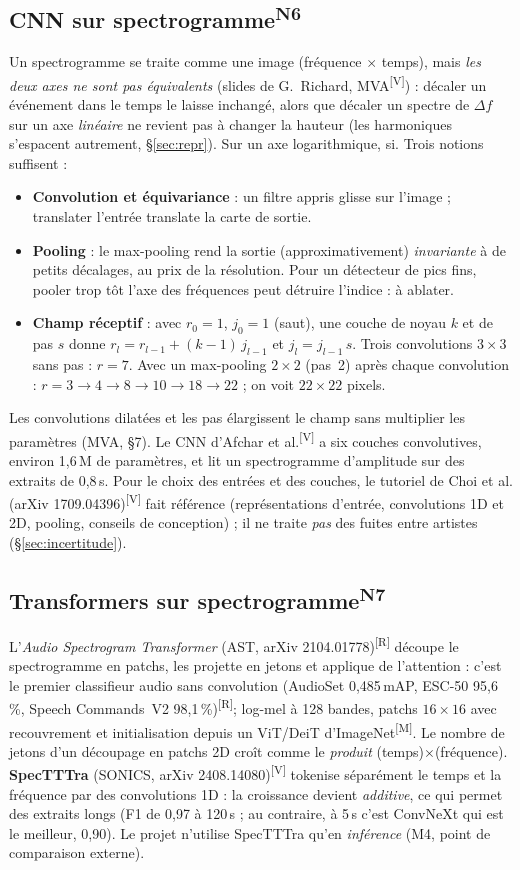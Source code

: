 \documentclass[10pt,a4paper]{article}
\newcommand{\sV}{\textsuperscript{\scriptsize\textcolor{green!40!black}{[V]}}}
\newcommand{\sR}{\textsuperscript{\scriptsize\textcolor{orange!80!black}{[R]}}}
\newcommand{\sM}{\textsuperscript{\scriptsize\textcolor{red!70!black}{[M]}}}
\newcommand{\nref}[1]{\textsuperscript{\scriptsize\textcolor{black!55}{#1}}}
\begin{document}
\subsection{CNN sur spectrogramme\nref{N6}}
Un spectrogramme se traite comme une image (fréquence $\times$ temps), mais \emph{les deux axes ne sont pas équivalents} (slides de G.~Richard, MVA\sV) : décaler un événement dans le temps le laisse inchangé, alors que décaler un spectre de $\Delta f$ sur un axe \emph{linéaire} ne revient pas à changer la hauteur (les harmoniques s'espacent autrement, §\ref{sec:repr}). Sur un axe logarithmique, si. Trois notions suffisent :
\begin{itemize}
  \item \textbf{Convolution et équivariance} : un filtre appris glisse sur l'image ; translater l'entrée translate la carte de sortie.
  \item \textbf{Pooling} : le max-pooling rend la sortie (approximativement) \emph{invariante} à de petits décalages, au prix de la résolution. Pour un détecteur de pics fins, pooler trop tôt l'axe des fréquences peut détruire l'indice : à ablater.
  \item \textbf{Champ réceptif} : avec $r_0=1$, $j_0=1$ (saut), une couche de noyau $k$ et de pas $s$ donne $r_l=r_{l-1}+(k-1)\,j_{l-1}$ et $j_l=j_{l-1}\,s$. Trois convolutions $3\times3$ sans pas : $r=7$. Avec un max-pooling $2\times2$ (pas~2) après chaque convolution : $r=3\to4\to8\to10\to18\to22$ ; on voit $22\times22$ pixels.
\end{itemize}
Les convolutions dilatées et les pas élargissent le champ sans multiplier les paramètres (MVA, \S7). Le CNN d'Afchar et al.\sV{} a six couches convolutives, environ 1,6\,M de paramètres, et lit un spectrogramme d'amplitude sur des extraits de 0,8\,s. Pour le choix des entrées et des couches, le tutoriel de Choi et al. (arXiv 1709.04396)\sV{} fait référence (représentations d'entrée, convolutions 1D et 2D, pooling, conseils de conception) ; il ne traite \emph{pas} des fuites entre artistes (§\ref{sec:incertitude}).

\subsection{Transformers sur spectrogramme\nref{N7}}
L'\emph{Audio Spectrogram Transformer} (AST, arXiv 2104.01778)\sR{} découpe le spectrogramme en patchs, les projette en jetons et applique de l'attention : c'est le premier classifieur audio sans convolution (AudioSet 0,485\,mAP, ESC-50 95,6\,\%, Speech Commands~V2 98,1\,\%)\sR ; log-mel à 128 bandes, patchs $16\times16$ avec recouvrement et initialisation depuis un ViT/DeiT d'ImageNet\sM. Le nombre de jetons d'un découpage en patchs 2D croît comme le \emph{produit} (temps)$\times$(fréquence). \textbf{SpecTTTra} (SONICS, arXiv 2408.14080)\sV{} tokenise séparément le temps et la fréquence par des convolutions 1D : la croissance devient \emph{additive}, ce qui permet des extraits longs (F1 de 0,97 à 120\,s ; au contraire, à 5\,s c'est ConvNeXt qui est le meilleur, 0,90). Le projet n'utilise SpecTTTra qu'en \emph{inférence} (M4, point de comparaison externe).
\end{document}
